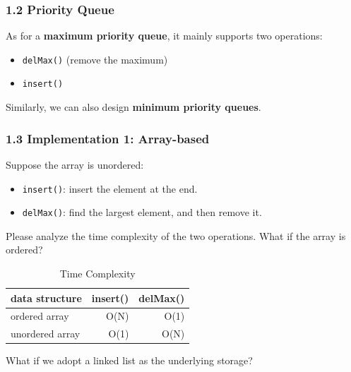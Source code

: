 \documentclass[aspectratio=169, 14pt]{beamer}
\begin{document}
\begin{frame}[fragile]
    \frametitle{1.2 Priority Queue}
As for a \textbf{maximum priority queue}, it mainly supports two operations:

\begin{itemize}
    \item \texttt{delMax()} (remove the maximum)
    \item \texttt{insert()}
\end{itemize}


Similarly, we can also design \textbf{minimum priority queues}.
\end{frame}

\begin{frame}
    \frametitle{1.3 Implementation 1: Array-based}
Suppose the array is unordered:

\begin{itemize}
    \item \texttt{insert()}: insert the element at the end.
    \item \texttt{delMax()}: find the largest element, and then remove it.
\end{itemize}

 Please analyze the time complexity of the two operations. What if the array is ordered?

\end{frame}

\begin{frame}
    
    \begin{table}
        \caption{Time Complexity}
        \begin{tabular}{lrr}
          \toprule
          data structure & insert() & delMax() \\
          \midrule
          ordered array & O(N) & O(1) \\
          unordered array & O(1) & O(N) \\
          \bottomrule
        \end{tabular}
    \end{table}

 What if we adopt a linked list as the underlying storage?
\end{frame}
\end{document}
